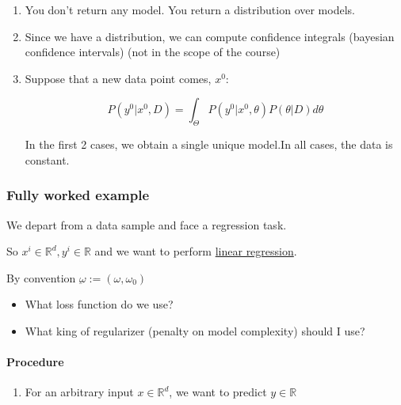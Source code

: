 \begin{enumerate}
\begin{enumerate}
		            \begin{enumerate}
			            \item
			                  You don't return any model. You return a distribution over models.
			            \item
			                  Since we have a distribution, we can compute confidence integrals
			                  (bayesian confidence intervals) (not in the scope of the course)
			            \item
			                  Suppose that a new data point comes, \(x^0\):

			                  \[P(y^0 | x^0, D) = \int_\Theta P(y^0 | x^0, \theta) P(\theta | D) d\theta
			                  \]

			                  In the first 2 cases, we obtain a single unique model.In all
			                  cases, the data is constant.
		            \end{enumerate}
	      \end{enumerate}
\end{enumerate}

\subsubsection{Fully worked example}

We depart from a data sample and face a regression task.

So \(x^i \in \mathds{R}^d, y^i \in \mathds{R}\) and we want to perform
\uline{linear regression}.

By convention \(\underbar{\omega} := (\omega, \omega_0)\)

\begin{itemize}
	\item
	      What loss function do we use?
	\item
	      What king of regularizer (penalty on model complexity) should I
	      use?
\end{itemize}

\paragraph{Procedure}

\begin{enumerate}
	\item
	      For an arbitrary input \(x \in \mathds{R}^d\), we want to predict
	      \(y \in \mathds{R}\)
\end{enumerate}

